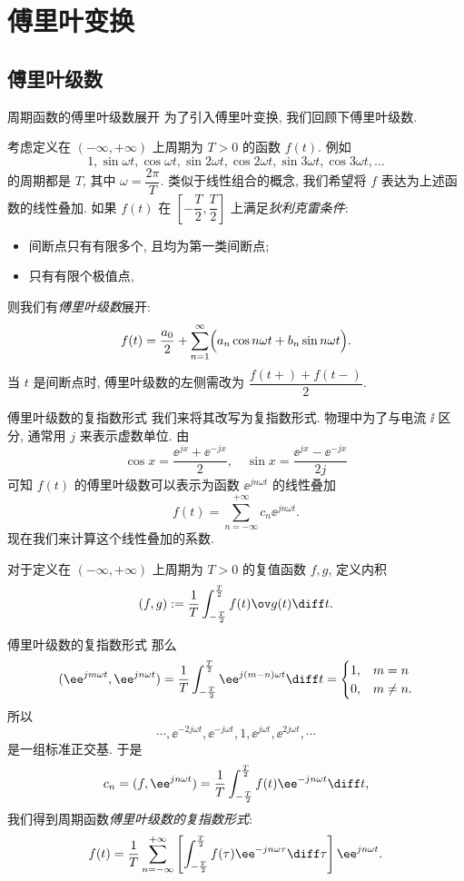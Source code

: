 \section{傅里叶变换}

\subsection{傅里叶级数}

\begin{frame}{周期函数的傅里叶级数展开}
	\onslide<+->
	为了引入傅里叶变换, 我们回顾下傅里叶级数.

	\onslide<+->
	考虑定义在 $(-\infty,+\infty)$ 上周期为 $T>0$ 的函数 $f(t)$.
	\onslide<+->
	例如
	\[
		1,\sin{\omega t},\cos{\omega t},
		\sin{2\omega t},\cos{2\omega t},
		\sin{3\omega t},\cos{3\omega t},\dots
	\]
	的周期都是 $T$, 其中 $\omega=\dfrac{2\pi}T$.
	\onslide<+->
	类似于线性组合的概念, 我们希望将 $f$ 表达为上述函数的线性叠加.
	\onslide<+->
	如果 $f(t)$ 在 $\left[-\dfrac T2,\dfrac T2\right]$ 上满足\emph{狄利克雷条件}:
	\begin{itemize}
		\item 间断点只有有限多个, 且均为第一类间断点;
		\item 只有有限个极值点,
	\end{itemize}
	\onslide<+->
	则我们有\emph{傅里叶级数}展开:
	\[f(t)=\frac{a_0}2+\sum_{n=1}^\infty \Bigl(a_n\cos n\omega t+b_n \sin n\omega t\Bigr).
	\]
	\onslide<+->
	当 $t$ 是间断点时, 傅里叶级数的左侧需改为 $\dfrac{f(t+)+f(t-)}2$.
\end{frame}


\begin{frame}{傅里叶级数的复指数形式}
	\onslide<+->
	我们来将其改写为复指数形式.
	\onslide<+->
	物理中为了与电流 $\ii$ 区分, 通常用 $j$ 来表示虚数单位.
	\onslide<+->
	由
	\[\cos x=\frac{\ee^{jx}+\ee^{-jx}}2,\quad \sin x=\frac{\ee^{jx}-\ee^{-jx}}{2j}
	\]
	\onslide<+->
	可知 $f(t)$ 的傅里叶级数可以表示为函数 $\ee^{jn\omega t}$ 的线性叠加
	\[
		f(t)=\sum_{n=-\infty}^{+\infty}c_n\ee^{jn\omega t}.
	\]
	\onslide<+->
	现在我们来计算这个线性叠加的系数.

	\onslide<+->
	对于定义在 $(-\infty,+\infty)$ 上周期为 $T>0$ 的\alert{复值}函数 $f,g$, 定义内积
	\[(f,g):=\frac1T\int_{-\frac T2}^{\frac T2} f(t)\ov g(t)\diff t.
	\]
\end{frame}


\begin{frame}{傅里叶级数的复指数形式}
	\onslide<+->
	那么
	\[(\ee^{jm\omega t},\ee^{jn\omega t})
	=\frac1T\int_{-\frac T2}^{\frac T2} \ee^{j(m-n)\omega t}\diff t=\begin{cases}
		1,&m=n\\
		0,&m\neq n.
	\end{cases}
	\]
	\onslide<+->
	所以
	\[\cdots,\ee^{-2j\omega t},\ee^{-j\omega t},1,\ee^{j\omega t},\ee^{2j\omega t},\cdots
	\]
	是一组标准正交基.
	\onslide<+->
	于是
	\[
		c_n=(f,\ee^{jn\omega t})=\frac 1T\int_{-\frac T2}^{\frac T2}f(t)\ee^{-jn\omega t} \diff t,
	\]
	\onslide<+->
	我们得到周期函数\emph{傅里叶级数的复指数形式}:
	\[
		f(t)=\frac 1T\sum_{n=-\infty}^{+\infty}\left[\int_{-\frac T2}^{\frac T2}f(\tau)\ee^{-jn\omega\tau} \diff\tau\right] \ee^{jn\omega t}.
	\]
\end{frame}


